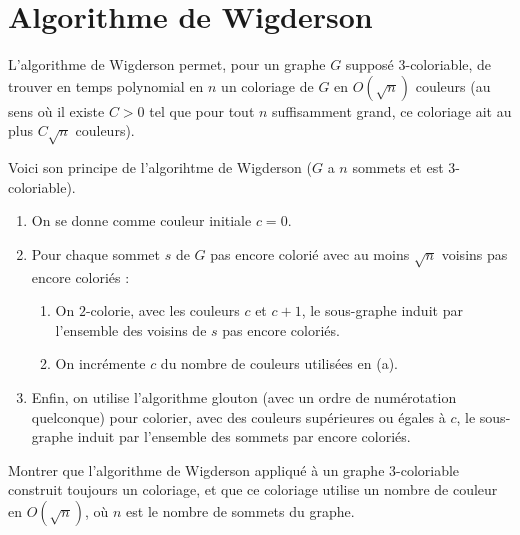 \section{Algorithme de Wigderson} 
L'algorithme de Wigderson permet, pour un graphe $G$ supposé $3$-coloriable, de trouver en temps polynomial en $n$ un coloriage de $G$ en $O(\sqrt{n})$ couleurs (au sens où il existe $C >0$ tel que pour tout $n$ suffisamment grand, ce coloriage ait au plus $C\sqrt{n}$ couleurs). 

Voici son principe de l'algorihtme de Wigderson ($G$ a $n$ sommets et est $3$-coloriable).
\begin{enumerate}
    \item On se donne comme couleur initiale $c=0$. 
    \item Pour chaque sommet $s$ de $G$ pas encore colorié avec au moins $\sqrt{n}$ voisins pas encore coloriés : \begin{enumerate}
        \item On $2$-colorie, avec les couleurs $c$ et $c+1$, le sous-graphe induit par l'ensemble des voisins de $s$ pas encore coloriés. 
        \item On incrémente $c$ du nombre de couleurs utilisées en (a). 
        \end{enumerate}
    \item Enfin, on utilise l'algorithme glouton (avec un ordre de numérotation quelconque) pour colorier, avec des couleurs supérieures ou égales à $c$, le sous-graphe induit par l'ensemble des sommets par encore coloriés. 
\end{enumerate}
\begin{Exercise}\label{q:pptewigderson} \it 

Montrer que l'algorithme de Wigderson appliqué à un graphe $3$-coloriable construit toujours un coloriage, et que ce coloriage utilise un nombre de couleur en $O(\sqrt{n})$, où $n$ est le nombre de sommets du graphe. 
\end{Exercise} 
